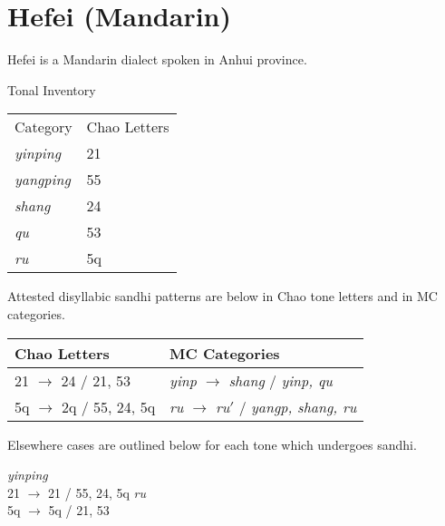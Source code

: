 \documentclass{article}
\begin{document}
\section{Hefei (Mandarin)}
Hefei is a Mandarin dialect spoken in Anhui province.\cite{Kong2008}
\begin{exe}
\ex Tonal Inventory \\
\begin{tabular}[t]{|ll|}
\hline
Category & Chao Letters \\
\textit{yinping} & 21 \\
\textit{yangping} & 55 \\
\textit{shang} & 24 \\
\textit{qu} &  53 \\
\textit{ru} & 5q \\
\hline
\end{tabular}
\end{exe}
Attested disyllabic sandhi patterns are below in Chao tone letters and in MC categories.
\begin{exe}
\ex
\begin{tabular}[t]{ll}
Chao Letters & MC Categories \\
\hline
21 $\rightarrow$ 24 / \underline{\hspace{1em}} 21, 53 & \textit{yinp} $\rightarrow$ \textit{shang} / \underline{\hspace{1em}} \textit{yinp, qu} \\ 
5q $\rightarrow$ 2q / \underline{\hspace{1em}} 55, 24, 5q & \textit{ru} $\rightarrow$ \textit{ru}$'$ / \underline{\hspace{1em}} \textit{yangp, shang, ru} \\ 
\end{tabular}
\end{exe}
Elsewhere cases are outlined below for each tone which undergoes sandhi.
\begin{exe}
\ex 
\begin{xlist}
\ex \textit{yinping} \\
21 $\rightarrow$ 21 / \underline{\hspace{1em}} 55, 24, 5q
\ex \textit{ru} \\
5q $\rightarrow$ 5q / \underline{\hspace{1em}} 21, 53
\end{xlist}
\end{exe}
\end{document}
